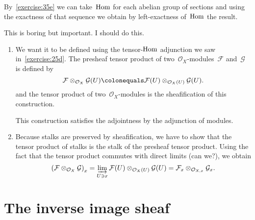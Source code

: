 \begin{exercise}
  By~\autoref{exercise:35e} we can take~$\operatorname{Hom}$ for each abelian group of sections and using the exactness of that sequence we obtain by left-exactness of~$\operatorname{Hom}$ the result.
\end{exercise}

\begin{exercise}
  \label{exercise:35h}
  This is boring but important. I should do this.
\end{exercise}

\begin{exercise}
  \label{exercise:35i}
  \begin{enumerate}
    \item We want it to be defined using the tensor-$\operatorname{Hom}$ adjunction we saw in~\autoref{exercise:25d}. The presheaf tensor product of two~$\mathcal{O}_X$-modules~$\mathcal{F}$ and~$\mathcal{G}$ is defined by
      \begin{equation}
        \mathcal{F}\otimes_{\mathcal{O}_X}\mathcal{G}(U)\colonequals\mathcal{F}(U)\otimes_{\mathcal{O}_X(U)}\mathcal{G}(U).
      \end{equation}
      and the tensor product of two~$\mathcal{O}_X$\nobreakdash-modules is the sheafification of this construction.

      This construction satisfies the adjointness by the adjunction of modules.

    \item Because stalks are preserved by sheafification, we have to show that the tensor product of stalks is the stalk of the presheaf tensor product. Using the fact that the tensor product commutes with direct limits (can we?), we obtain
      \begin{equation}
        \left( \mathcal{F}\otimes_{\mathcal{O}_X}\mathcal{G} \right)_x=\varinjlim_{U\ni x}\mathcal{F}(U)\otimes_{\mathcal{O}_X(U)}\mathcal{G}(U)=\mathcal{F}_x\otimes_{\mathcal{O}_{X,x}}\mathcal{G}_x.
      \end{equation}
  \end{enumerate}
\end{exercise}


\section{The inverse image sheaf}

